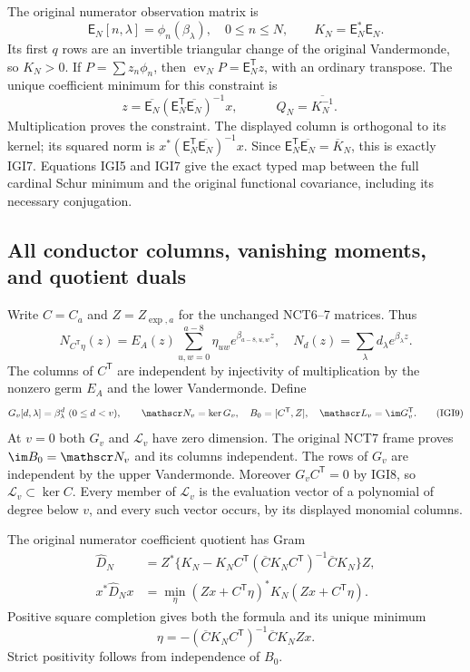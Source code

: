 \documentclass[11pt,a4paper]{article}
\begin{document}
The original numerator observation matrix is
\[
 \mathsf E_N[n,\lambda]=\phi_n(\beta_\lambda),\quad 0\le n\le N,
 \qquad K_N=\mathsf E_N^*\mathsf E_N .                    \tag{IGI6}
\]
Its first $q$ rows are an invertible triangular change of the
original Vandermonde, so $K_N>0$. If $P=\sum z_n\phi_n$, then
$\operatorname{ev}_NP=\mathsf E_N^{\mathsf T}z$, with an ordinary
transpose. The unique coefficient minimum for this constraint is
\[
 z=\overline{\mathsf E_N}
       (\mathsf E_N^{\mathsf T}\overline{\mathsf E_N})^{-1}x,
 \qquad
 \boxed{\quad Q_N=\overline{K_N^{-1}}.\quad}              \tag{IGI7}
\]
Multiplication proves the constraint. The displayed column is
orthogonal to its kernel; its squared norm is
$x^*(\mathsf E_N^{\mathsf T}\overline{\mathsf E_N})^{-1}x$.
Since $\mathsf E_N^{\mathsf T}\overline{\mathsf E_N}=\overline K_N$,
this is exactly IGI7. Equations IGI5 and IGI7 give the exact typed
map between the full cardinal Schur minimum and the original
functional covariance, including its necessary conjugation.

\subsection{All conductor columns, vanishing moments, and quotient duals}
Write $C=C_a$ and $Z=Z_{\exp,a}$ for the unchanged NCT6--7
matrices. Thus
\[
 N_{C^{\mathsf T}\eta}(z)
       =E_A(z)\sum_{u,w=0}^{a-8}\eta_{uw}e^{\beta_{a-8,u,w}z},
 \quad N_d(z)=\sum_\lambda d_\lambda e^{\beta_\lambda z}.
                                                               \tag{IGI8}
\]
The columns of $C^{\mathsf T}$ are independent by injectivity of
multiplication by the nonzero germ $E_A$ and the lower Vandermonde.
Define
\[
 G_v[d,\lambda]=\beta_\lambda^d\ (0\le d<v),\qquad
 \mathscr N_v=\ker G_v,
 \quad B_0=[C^{\mathsf T},Z],\quad
 \mathscr L_v=\im G_v^{\mathsf T}.                         \tag{IGI9}
\]
At $v=0$ both $G_v$ and $\mathscr L_v$ have zero dimension.
The original NCT7 frame proves $\im B_0=\mathscr N_v$ and its
columns independent. The rows of $G_v$ are independent by the upper
Vandermonde. Moreover $G_vC^{\mathsf T}=0$ by IGI8, so
$\mathscr L_v\subset\ker C$. Every member of $\mathscr L_v$ is
the evaluation vector of a polynomial of degree below $v$, and
every such vector occurs, by its displayed monomial columns.

The original numerator coefficient quotient has Gram
\[
\begin{aligned}
 \widehat D_N&=Z^*\{K_N-K_NC^{\mathsf T}
    (\overline C K_NC^{\mathsf T})^{-1}
                         \overline C K_N\}Z,
 \\
 x^*\widehat D_Nx&=\min_\eta
      (Zx+C^{\mathsf T}\eta)^*K_N(Zx+C^{\mathsf T}\eta).
\end{aligned}                                                      \tag{IGI10}
\]
Positive square completion gives both the formula and its unique
minimum
\[
\eta=-(\overline C K_NC^{\mathsf T})^{-1}\overline C K_NZx.
\]
Strict positivity follows from independence of $B_0$.
\end{document}
